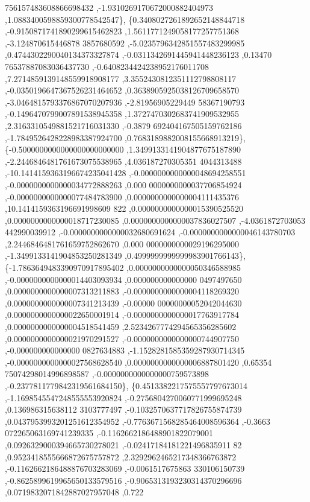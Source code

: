 \begin{DoxyCode}
      756157483608866698432 ,-1.9310269170672000882404973 ,1.0883400598859300778542547\},
\{0.3408027261892652148844718 ,-0.9150871741890299615462823 ,1.5611771249058177257751368 ,-3.124870615446878
      3857680592 ,-5.0235796342851557483299985 ,0.4744302290040134373327874 ,-0.0311342691445941448236123 ,0.13470
      76537887083036437730 ,-0.6408234424238952176011708 ,7.2714859139148559918908177 ,3.3552430812351112798808117
       ,-0.0350196647367526231464652 ,0.3638905925038126709658570 ,-3.0464815793376867070207936 ,-2.81956905229449
      58367190793 ,-0.1496470799007891538945358 ,1.3727470302683741909532955 ,2.3163310549881521716031330 ,-0.3879
      692404167505159762186 ,-1.7849526428228983387924700 ,0.7683189882008155668913219\},
\{-0.5000000000000000000000000 ,1.3499133141904877675187890 ,-2.2446846481761673075538965 ,4.036187270305351
      4044313488 ,-10.1414159363196674235041428 ,-0.0000000000000048694258551 ,-0.0000000000000034772888263 ,0.000
      0000000000037706854924 ,-0.0000000000000077484783900 ,0.0000000000000004111435376 ,10.1414159363196691998609
      822 ,0.0000000000000015390525520 ,0.0000000000000018717230085 ,0.0000000000000037836027507 ,-4.0361872703053
      442990039912 ,-0.0000000000000032680691624 ,-0.0000000000000046143780703 ,2.2446846481761659752862670 ,0.000
      0000000000029196295000 ,-1.3499133141904853250281349 ,0.4999999999999983901766143\},
\{-1.7863649483390970917895402 ,0.0000000000000050346588985 ,-0.0000000000000014403093934 ,0.000000000000000
      0497497650 ,0.0000000000000007313211883 ,-0.0000000000000004118269320 ,0.0000000000000007341213439 ,-0.00000
      00000000052042044630 ,0.0000000000000022650001914 ,-0.0000000000000017763917784 ,0.0000000000000004518541459
       ,2.5234267774294565356285602 ,0.0000000000000021970291527 ,-0.0000000000000000744907750 ,-0.000000000000000
      0827634883 ,-1.1528281585359287930714345 ,-0.0000000000000027568628540 ,0.0000000000000006887801420 ,0.65354
      75074298014996898587 ,-0.0000000000000000759573898 ,-0.2377811779842319561684150\},
\{0.4513382217575557797673014 ,-1.1698545547248555553920824 ,-0.2756804270060771999695248 ,0.136986315638112
      3103777497 ,-0.1032570637717826755874739 ,0.0437953993201251612354952 ,-0.7763671568285464008596364 ,-0.3663
      072265063169741239335 ,-0.1162662186488901822079001 ,0.0926329000394665730278021 ,-0.02417184181221496835911
      82 ,0.9523418555666872675757872 ,2.3292962465217348366763872 ,-0.1162662186488876703283069 ,-0.0061517675863
      330106150739 ,-0.8625899619965650133579516 ,-0.9065313193230314370296696 ,0.0719832071842887027957048 ,0.722

\end{DoxyCode}
